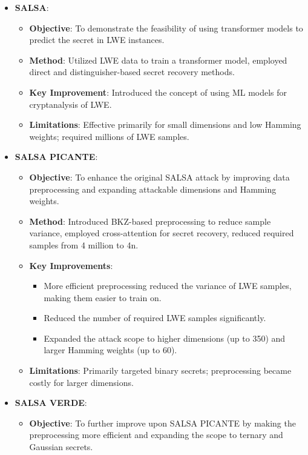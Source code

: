 \documentclass{article}
\begin{document}
\begin{itemize}
    \item \textbf{SALSA}:
    \begin{itemize}
        \item \textbf{Objective}: To demonstrate the feasibility of using transformer models to predict the secret in LWE instances.
        \item \textbf{Method}: Utilized LWE data to train a transformer model, employed direct and distinguisher-based secret recovery methods.
        \item \textbf{Key Improvement}: Introduced the concept of using ML models for cryptanalysis of LWE.
        \item \textbf{Limitations}: Effective primarily for small dimensions and low Hamming weights; required millions of LWE samples.
    \end{itemize}
    \item \textbf{SALSA PICANTE}:
    \begin{itemize}
        \item \textbf{Objective}: To enhance the original SALSA attack by improving data preprocessing and expanding attackable dimensions and Hamming weights.
        \item \textbf{Method}: Introduced BKZ-based preprocessing to reduce sample variance, employed cross-attention for secret recovery, reduced required samples from 4 million to 4n.
        \item \textbf{Key Improvements}: 
        \begin{itemize}
            \item More efficient preprocessing reduced the variance of LWE samples, making them easier to train on.
            \item Reduced the number of required LWE samples significantly.
            \item Expanded the attack scope to higher dimensions (up to 350) and larger Hamming weights (up to 60).
        \end{itemize}
        \item \textbf{Limitations}: Primarily targeted binary secrets; preprocessing became costly for larger dimensions.
    \end{itemize}
    \item \textbf{SALSA VERDE}:
    \begin{itemize}
        \item \textbf{Objective}: To further improve upon SALSA PICANTE by making the preprocessing more efficient and expanding the scope to ternary and Gaussian secrets.

\end{itemize}
\end{itemize}
\end{document}
